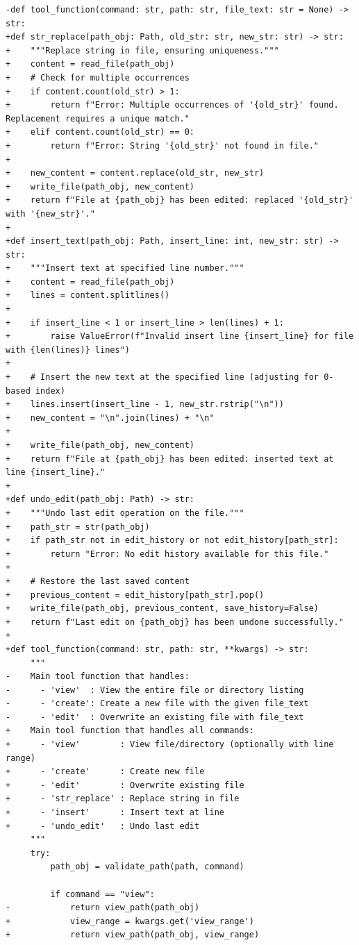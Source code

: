 \documentclass{article}
\begin{document}
\begin{lstlisting}[style=diffstyle]
-def tool_function(command: str, path: str, file_text: str = None) -> str:
+def str_replace(path_obj: Path, old_str: str, new_str: str) -> str:
+    """Replace string in file, ensuring uniqueness."""
+    content = read_file(path_obj)
+    # Check for multiple occurrences
+    if content.count(old_str) > 1:
+        return f"Error: Multiple occurrences of '{old_str}' found. Replacement requires a unique match."
+    elif content.count(old_str) == 0:
+        return f"Error: String '{old_str}' not found in file."
+
+    new_content = content.replace(old_str, new_str)
+    write_file(path_obj, new_content)
+    return f"File at {path_obj} has been edited: replaced '{old_str}' with '{new_str}'."
+
+def insert_text(path_obj: Path, insert_line: int, new_str: str) -> str:
+    """Insert text at specified line number."""
+    content = read_file(path_obj)
+    lines = content.splitlines()
+
+    if insert_line < 1 or insert_line > len(lines) + 1:
+        raise ValueError(f"Invalid insert line {insert_line} for file with {len(lines)} lines")
+
+    # Insert the new text at the specified line (adjusting for 0-based index)
+    lines.insert(insert_line - 1, new_str.rstrip("\n"))
+    new_content = "\n".join(lines) + "\n"
+    
+    write_file(path_obj, new_content)
+    return f"File at {path_obj} has been edited: inserted text at line {insert_line}."
+
+def undo_edit(path_obj: Path) -> str:
+    """Undo last edit operation on the file."""
+    path_str = str(path_obj)
+    if path_str not in edit_history or not edit_history[path_str]:
+        return "Error: No edit history available for this file."
+
+    # Restore the last saved content
+    previous_content = edit_history[path_str].pop()
+    write_file(path_obj, previous_content, save_history=False)
+    return f"Last edit on {path_obj} has been undone successfully."
+
+def tool_function(command: str, path: str, **kwargs) -> str:
     """
-    Main tool function that handles:
-      - 'view'  : View the entire file or directory listing
-      - 'create': Create a new file with the given file_text
-      - 'edit'  : Overwrite an existing file with file_text
+    Main tool function that handles all commands:
+      - 'view'        : View file/directory (optionally with line range)
+      - 'create'      : Create new file
+      - 'edit'        : Overwrite existing file
+      - 'str_replace' : Replace string in file
+      - 'insert'      : Insert text at line
+      - 'undo_edit'   : Undo last edit
     """
     try:
         path_obj = validate_path(path, command)
 
         if command == "view":
-            return view_path(path_obj)
+            view_range = kwargs.get('view_range')
+            return view_path(path_obj, view_range)
 

\end{lstlisting}
\end{document}
